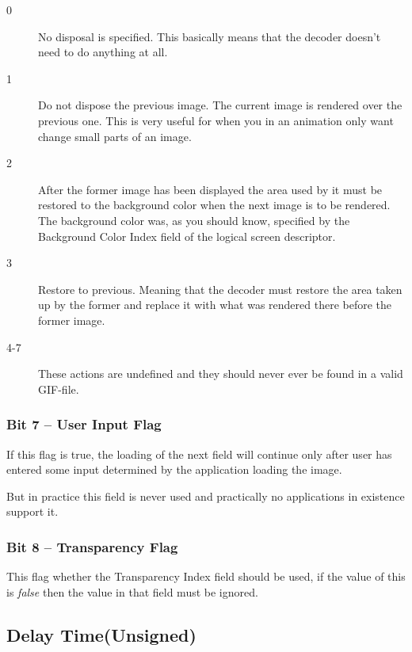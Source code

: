   \begin{description}

  \item[0] No disposal is specified. This basically means that
    the decoder doesn't need to do anything at all.

  \item[1] Do not dispose the previous image. The current image is
    rendered over the previous one. This is very useful for when you
    in an animation only want change small parts of an image.

  \item[2] After the former image has been displayed the area used by
    it must be restored to the background color when the next image is
    to be rendered. The background color was, as you should know,
    specified by the Background Color Index field of the logical
    screen descriptor.

  \item[3] Restore to previous. Meaning that the decoder must restore
    the area taken up by the former and replace it with what was
    rendered there before the former image. 

  \item[4-7] These actions are undefined and they should never ever be
    found in a valid GIF-file.
  \end{description}

  \subsubsection{Bit 7  -- User Input Flag}

  If this flag is true, the loading of the next field will continue
  only after user has entered some input determined by the application
  loading the image.

  But in practice this field is never used and practically no applications
  in existence support it.

  \subsubsection{Bit 8 -- Transparency Flag }

  This flag whether the Transparency Index field should be used, if
  the value of this is \textit{false} then the value in that field must be
  ignored.

  \subsection{Delay Time(Unsigned)}

